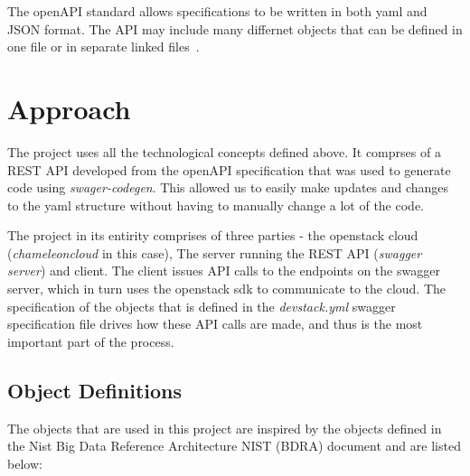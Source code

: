 The openAPI standard allows specifications to be written in both yaml
and JSON format. The API may include many differnet objects that can
be defined in one file or in separate linked
files~\cite{hid-sp18-503-swagger-openapi}. 
\section{Approach}

The project uses all the technological concepts defined above. It
comprses of a REST API developed from the openAPI specification that
was used to generate code using \emph{swager-codegen}. This allowed us
to easily make updates and changes to the yaml structure without
having to manually change a lot of the code.

The project in its entirity comprises of three parties - the openstack
cloud (\emph{chameleoncloud} in this case), The server running the
REST API (\emph{swagger server}) and client. The client issues API
calls to the endpoints on the swagger server, which in turn uses the
openstack sdk to communicate to the cloud. The specification of the
objects that is defined in the \emph{devstack.yml} swagger
specification file drives how these API calls are made, and thus is
the most important part of the process. 

\subsection{Object Definitions}
The objects that are used in this project are inspired by the objects
defined in the Nist Big Data Reference Architecture NIST (BDRA)
document and are listed below:

